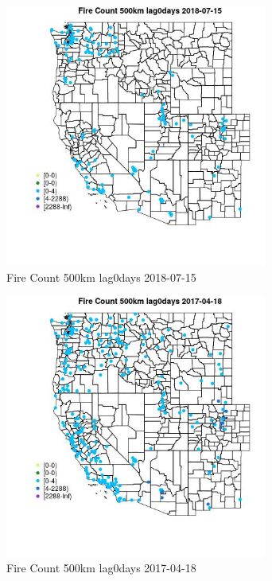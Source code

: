 \begin{figure} 
\centering  
\includegraphics[width=0.77\textwidth]{Code_Outputs/Report_ML_input_PM25_Step4_part_e_de_duplicated_aves_compiled_2019-05-20wNAs_MapObsFire_Count_500km_lag0days2018-07-15.jpg} 
\caption{\label{fig:Report_ML_input_PM25_Step4_part_e_de_duplicated_aves_compiled_2019-05-20wNAsMapObsFire_Count_500km_lag0days2018-07-15}Fire Count 500km lag0days 2018-07-15} 
\end{figure} 
 

\clearpage 

\begin{figure} 
\centering  
\includegraphics[width=0.77\textwidth]{Code_Outputs/Report_ML_input_PM25_Step4_part_e_de_duplicated_aves_compiled_2019-05-20wNAs_MapObsFire_Count_500km_lag0days2017-04-18.jpg} 
\caption{\label{fig:Report_ML_input_PM25_Step4_part_e_de_duplicated_aves_compiled_2019-05-20wNAsMapObsFire_Count_500km_lag0days2017-04-18}Fire Count 500km lag0days 2017-04-18} 
\end{figure} 
 

